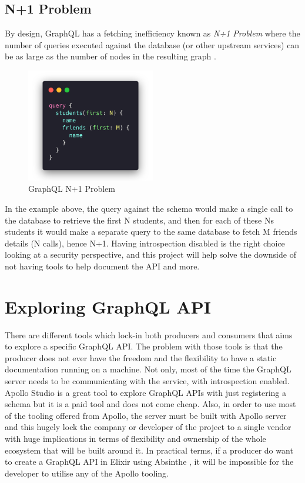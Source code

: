 \subsection{N+1 Problem}
\label{s:N1-Problem}
By design, GraphQL has a fetching inefficiency known as \textit{N+1 Problem}
where the number of queries executed against the database (or other upstream
services) can be as large as the number of nodes in the resulting graph \citep{
graphqlbypopSuppressingProblemGraphQL2020}.
\begin{figure}[H]
  \centering
  \includegraphics[width=0.5\textwidth]{figures/code/n+1}
  \caption{GraphQL N+1 Problem}
  \label{f:GraphQL-N1-Problem}
\end{figure}
In the example above, the query against the schema would make a single call to
the database to retrieve the first N students, and then for each of these Ns
students it would make a separate query to the same database to fetch M friends
details (N calls), hence N+1. Having introspection disabled is the right choice
looking at a security perspective, and this project will help solve the downside
of not having tools to help document the API and more.

\section{Exploring GraphQL API}
\label{s:Literature-ExploringGraphQLAPI}
There are different tools which lock-in both producers and consumers that aims
to explore a specific GraphQL API. The problem with those tools is that the
producer does not ever have the freedom and the flexibility to have a static
documentation running on a machine. Not only, most of the time the GraphQL
server needs to be communicating with the service, with introspection enabled.
Apollo Studio is a great tool to explore GraphQL APIs with just registering a
schema but it is a paid tool and does not come cheap. Also, in order to use most
of the tooling offered from Apollo, the server must be built with Apollo server
and this hugely lock the company or developer of the project to a single vendor
with huge implications in terms of flexibility and ownership of the whole
ecosystem that will be built around it. In practical terms, if a producer do
want to create a GraphQL API in Elixir using Absinthe \citep{
hexdocsOverviewAbsintheV12022}, it will be impossible for the developer to
utilise any of the Apollo tooling.


